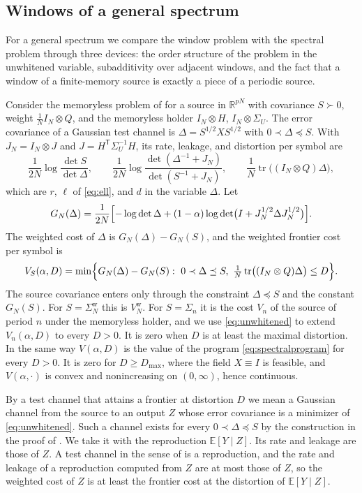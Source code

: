 \documentclass[11pt,onecolumn]{IEEEtran}
\newcommand{\E}{\mathbb{E}}
\newcommand{\R}{\mathbb{R}}
\newcommand{\tr}{\operatorname{tr}}
\begin{document}
\subsection{Windows of a general spectrum}

For a general spectrum we compare the window problem with the spectral
problem through three devices: the order structure of the problem in
the unwhitened variable, subadditivity over adjacent windows, and the
fact that a window of a finite-memory source is exactly a piece of a
periodic source.

Consider the memoryless problem of \cite{part1} for a source in
$\R^{pN}$ with covariance $S\succ0$, weight $\tfrac1NI_N\otimes Q$, and
the memoryless holder $I_N\otimes H$, $I_N\otimes\Sigma_U$. The error
covariance of a Gaussian test channel is $\Delta=S^{1/2}XS^{1/2}$ with
$0\prec\Delta\preceq S$. With $J_N=I_N\otimes J$ and
$J=H^{\mathsf T}\Sigma_U^{-1}H$, its rate, leakage, and distortion per
symbol are
\[
\frac1{2N}\log\frac{\det S}{\det\Delta},\qquad
\frac1{2N}\log\frac{\det(\Delta^{-1}+J_N)}{\det(S^{-1}+J_N)},\qquad
\frac1N\tr\bigl((I_N\otimes Q)\Delta\bigr),
\]
which are $r$, $\ell$ of \eqref{eq:ell}, and $d$ in the variable $\Delta$.
Let
\begin{equation}
G_N(\Delta)=\frac1{2N}\Bigl[-\log\det\Delta+(1-\alpha)\log\det\bigl(I+J_N^{1/2}\Delta J_N^{1/2}\bigr)\Bigr].
\label{eq:GN}
\end{equation}
The weighted cost of $\Delta$ is $G_N(\Delta)-G_N(S)$, and the weighted
frontier cost per symbol is
\begin{equation}
V_S(\alpha,D)=\min\Bigl\{G_N(\Delta)-G_N(S):\ 0\prec\Delta\preceq S,\
\tfrac1N\tr\bigl((I_N\otimes Q)\Delta\bigr)\le D\Bigr\}.
\label{eq:unwhitened}
\end{equation}
The source covariance enters only through the constraint
$\Delta\preceq S$ and the constant $G_N(S)$. For $S=\Sigma^{\mathrm w}_N$
this is $V^{\mathrm w}_N$. For $S=\Sigma_n$ it is the cost $V_n$ of the
source of period $n$ under the memoryless holder, and we use
\eqref{eq:unwhitened} to extend $V_n(\alpha,D)$ to every $D>0$. It is
zero when $D$ is at least the maximal distortion. In the same way
$V(\alpha,D)$ is the value of the program \eqref{eq:spectralprogram}
for every $D>0$. It is zero for $D\ge D_{\max}$, where the field
$X\equiv I$ is feasible, and $V(\alpha,\cdot)$ is convex and
nonincreasing on $(0,\infty)$, hence continuous.

By a test channel that attains a frontier at distortion $D$ we mean a
Gaussian channel from the source to an output $Z$ whose error
covariance is a minimizer of \eqref{eq:unwhitened}. Such a channel
exists for every $0\prec\Delta\preceq S$ by the construction in the
proof of \cite[Proposition~2]{part1}. We take it with the
reproduction $\E[Y\mid Z]$. Its rate and leakage are those of $Z$. A
test channel in the sense of \cite[Proposition~2]{part1} is a
reproduction, and the rate and leakage of a reproduction computed from
$Z$ are at most those of $Z$, so the weighted cost of $Z$ is at least
the frontier cost at the distortion of $\E[Y\mid Z]$.
\end{document}

